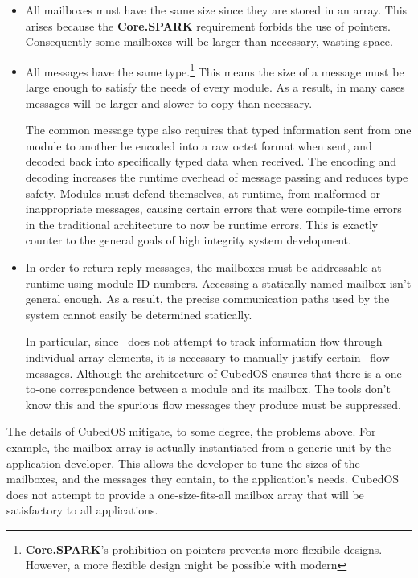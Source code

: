 \begin{itemize}
\item All mailboxes must have the same size since they are stored in an array. This arises
  because the \textbf{Core.SPARK} requirement forbids the use of pointers. Consequently some
  mailboxes will be larger than necessary, wasting space. 

\item All messages have the same type.\footnote{\textbf{Core.SPARK}'s prohibition on pointers
    prevents more flexibile designs. However, a more flexible design might be possible with
    modern \SPARK} This means the size of a message must be large enough to satisfy the needs of
  every module. As a result, in many cases messages will be larger and slower to copy than
  necessary.

  The common message type also requires that typed information sent from one module to another
  be encoded into a raw octet format when sent, and decoded back into specifically typed data
  when received. The encoding and decoding increases the runtime overhead of message passing and
  reduces type safety. Modules must defend themselves, at runtime, from malformed or
  inappropriate messages, causing certain errors that were compile-time errors in the
  traditional architecture to now be runtime errors. This is exactly counter to the general
  goals of high integrity system development.

\item In order to return reply messages, the mailboxes must be addressable at runtime using
  module ID numbers. Accessing a statically named mailbox isn't general enough. As a result, the
  precise communication paths used by the system cannot easily be determined statically.

  In particular, since \SPARK\ does not attempt to track information flow through individual
  array elements, it is necessary to manually justify certain \SPARK\ flow messages.  Although the architecture of CubedOS ensures that there
  is a one-to-one correspondence between a module and its mailbox. The tools don't know this and
  the spurious flow messages they produce must be suppressed.
\end{itemize}

The details of CubedOS mitigate, to some degree, the problems above. For example, the mailbox
array is actually instantiated from a generic unit by the application developer. This allows the
developer to tune the sizes of the mailboxes, and the messages they contain, to the
application's needs. CubedOS does not attempt to provide a one-size-fits-all mailbox array that
will be satisfactory to all applications.

